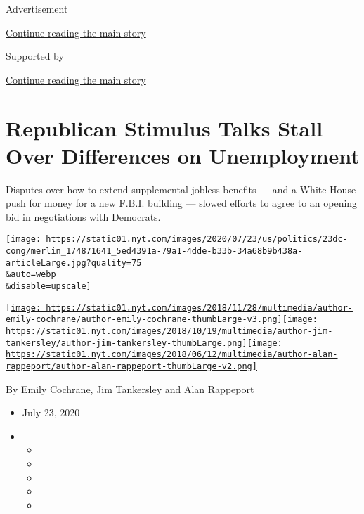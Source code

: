 Advertisement

\protect\hyperlink{after-top}{Continue reading the main story}

Supported by

\protect\hyperlink{after-sponsor}{Continue reading the main story}

\hypertarget{republican-stimulus-talks-stall-over-differences-on-unemployment}{%
\section{Republican Stimulus Talks Stall Over Differences on
Unemployment}\label{republican-stimulus-talks-stall-over-differences-on-unemployment}}

Disputes over how to extend supplemental jobless benefits --- and a
White House push for money for a new F.B.I. building --- slowed efforts
to agree to an opening bid in negotiations with Democrats.

\texttt{[image: https://static01.nyt.com/images/2020/07/23/us/politics/23dc-cong/merlin\_174871641\_5ed4391a-79a1-4dde-b33b-34a68b9b438a-articleLarge.jpg?quality=75\\\&auto=webp\\\&disable=upscale]}

\href{https://www.nytimes.com/by/emily-cochrane}{\texttt{[image: https://static01.nyt.com/images/2018/11/28/multimedia/author-emily-cochrane/author-emily-cochrane-thumbLarge-v3.png]}}\href{https://www.nytimes.com/by/jim-tankersley}{\texttt{[image: https://static01.nyt.com/images/2018/10/19/multimedia/author-jim-tankersley/author-jim-tankersley-thumbLarge.png]}}\href{https://www.nytimes.com/by/alan-rappeport}{\texttt{[image: https://static01.nyt.com/images/2018/06/12/multimedia/author-alan-rappeport/author-alan-rappeport-thumbLarge-v2.png]}}

By \href{https://www.nytimes.com/by/emily-cochrane}{Emily Cochrane},
\href{https://www.nytimes.com/by/jim-tankersley}{Jim Tankersley} and
\href{https://www.nytimes.com/by/alan-rappeport}{Alan Rappeport}

\begin{itemize}
\item
  July 23, 2020
\item
  \begin{itemize}
  \item
  \item
  \item
  \item
  \item
  \end{itemize}
\end{itemize}

